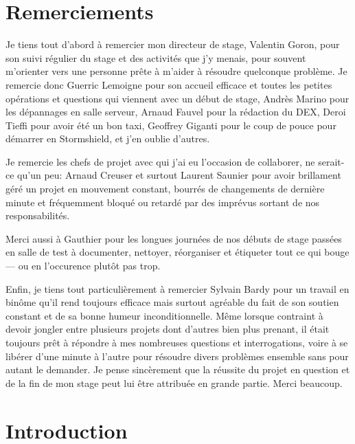 \documentclass[12pt, oneside, a4paper, titlepage]{report}
\begin{document}
\begin{titlepage}
    
\end{titlepage}

\tableofcontents



\chapter{Remerciements}%
\label{cha:ackn}

Je tiens tout d'abord à remercier mon directeur de stage, Valentin Goron, pour
son suivi régulier du stage et des activités que j'y menais, pour souvent
m'orienter vers une personne prête à m'aider à résoudre quelconque problème. Je
remercie donc Guerric Lemoigne pour son accueil efficace et toutes les petites
opérations et questions qui viennent avec un début de stage, Andrès Marino pour
les dépannages en salle serveur, Arnaud Fauvel pour la rédaction du DEX, Deroi
Tieffi pour avoir été un bon taxi, Geoffrey Giganti pour le coup de pouce pour
démarrer en Stormshield, et j'en oublie d'autres.

Je remercie les chefs de projet avec qui j'ai eu l'occasion de collaborer, ne
serait-ce qu'un peu: Arnaud Creuser et surtout Laurent Saunier pour avoir
brillament géré un projet en mouvement constant, bourrés de changements de
dernière minute et fréquemment bloqué ou retardé par des imprévus sortant de nos
responsabilités.

Merci aussi à Gauthier pour les longues journées de nos débuts de stage passées
en salle de test à documenter, nettoyer, réorganiser et étiqueter tout ce qui
bouge --- ou en l'occurence plutôt pas trop.

Enfin, je tiens tout particulièrement à remercier Sylvain Bardy pour un travail
en binôme qu'il rend toujours efficace mais surtout agréable du fait de son
soutien constant et de sa bonne humeur inconditionnelle. Même lorsque contraint
à devoir jongler entre plusieurs projets dont d'autres bien plus prenant, il
était toujours prêt à répondre à mes nombreuses questions et interrogations,
voire à se libérer d'une minute à l'autre pour résoudre divers problèmes
ensemble sans pour autant le demander. Je pense sincèrement que la réussite du
projet en question et de la fin de mon stage peut lui être attribuée en grande
partie. Merci beaucoup.

\chapter{Introduction}%
\label{cha:intro}
\end{document}
